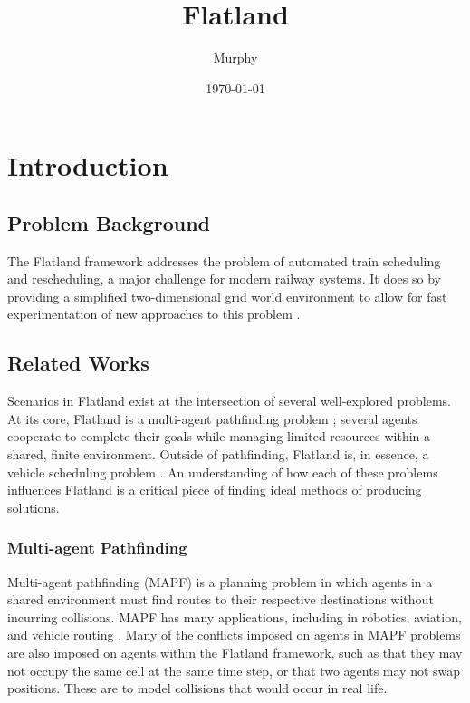 \documentclass[11pt]{article}
\title{Flatland}
\author{Murphy}
\date{\today}
\begin{document}
\maketitle	
\pagebreak

\tableofcontents
\pagebreak


\section{Introduction}
\subsection{Problem Background}
The Flatland framework addresses the problem of automated train scheduling and rescheduling, a major challenge
for modern railway systems. It does so by providing a simplified two-dimensional grid world environment to allow for fast experimentation of new approaches to this problem \citep{monylascscbhwaegeibavistsasp20a}. 

\subsection{Related Works}
Scenarios in Flatland exist at the intersection of several well-explored problems.  At its core, Flatland is a multi-agent pathfinding problem \citep{silver05a}; several agents cooperate to complete their goals while managing limited resources within a shared, finite environment.  Outside of pathfinding, Flatland is, in essence, a vehicle scheduling problem \citep{bapeukfa00a}.  An understanding of how each of these problems influences Flatland is a critical piece of finding ideal methods of producing solutions.

\subsubsection{Multi-agent Pathfinding}
Multi-agent pathfinding (MAPF) \citep{silver05a} is a planning problem in which agents in a shared environment must find routes to their respective destinations without incurring collisions.  MAPF has many applications, including in robotics, aviation, and vehicle routing \citep{standley10a}.  Many of the conflicts imposed on agents in MAPF problems are also imposed on agents within the Flatland framework, such as that they may not occupy the same cell at the same time step, or that two agents may not swap positions.  These are to model collisions that would occur in real life.  
\end{document}
